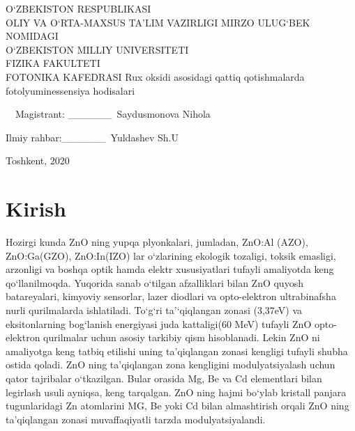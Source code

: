 \documentclass[14pt]{article}
\begin{document}
	\begin{titlepage}
		\begin{center}
			\large
			O`ZBEKISTON RESPUBLIKASI\\ OLIY VA O`RTA-MAXSUS TA'LIM VAZIRLIGI
			MIRZO ULUG`BEK NOMIDAGI\\O`ZBEKISTON MILLIY UNIVERSITETI\\FIZIKA FAKULTETI\\FOTONIKA KAFEDRASI
			\vspace{0.25cm}
			\vfill
			\Large 			
			\Huge		
			{\Huge Rux oksidi asosidagi qattiq qotishmalarda fotolyuminessensiya hodisalari\\
			}
			\bigskip
		\end{center}
		\vfill
		\huge \ \  Magistrant: \_\_\_\_\_\_\ Saydusmonova Nihola
		
		\huge Ilmiy rahbar:\_\_\_\_\_\_\ Yuldashev Sh.U
		\vfill
		\begin{center}
			Toshkent, 2020
		\end{center}
	\end{titlepage}
	\newpage
	\renewcommand{\contentsname}{Mundarija}
	\tableofcontents
	\newpage
	\section*{Kirish}
	\hspace{1cm}	
	Hozirgi kunda ZnO ning yupqa plyonkalari, jumladan, ZnO:Al (AZO), ZnO:Ga(GZO), ZnO:In(IZO) lar o`zlarining ekologik tozaligi, toksik emasligi, arzonligi va boshqa optik hamda elektr xususiyatlari tufayli amaliyotda keng qo`llanilmoqda. Yuqorida sanab o`tilgan afzalliklari bilan ZnO quyosh batareyalari, kimyoviy sensorlar, lazer diodlari va opto-elektron ultrabinafsha nurli qurilmalarda ishlatiladi. To`g`ri ta'`qiqlangan zonasi  (3,37eV) va eksitonlarning bog`lanish energiyasi juda kattaligi(60 MeV) tufayli ZnO opto-elektron qurilmalar uchun asosiy tarkibiy qism hisoblanadi. Lekin ZnO ni amaliyotga keng tatbiq etilishi uning ta'qiqlangan zonasi kengligi tufayli shubha ostida qoladi. ZnO ning ta'qiqlangan zona kengligini modulyatsiyalash uchun qator tajribalar o`tkazilgan. Bular orasida Mg, Be va Cd elementlari bilan legirlash usuli ayniqsa, keng tarqalgan. ZnO ning hajmi bo`ylab kristall panjara tugunlaridagi Zn atomlarini MG, Be yoki Cd bilan almashtirish  orqali ZnO ning ta'qiqlangan zonasi muvaffaqiyatli tarzda modulyatsiyalandi. 
	
\end{document}
